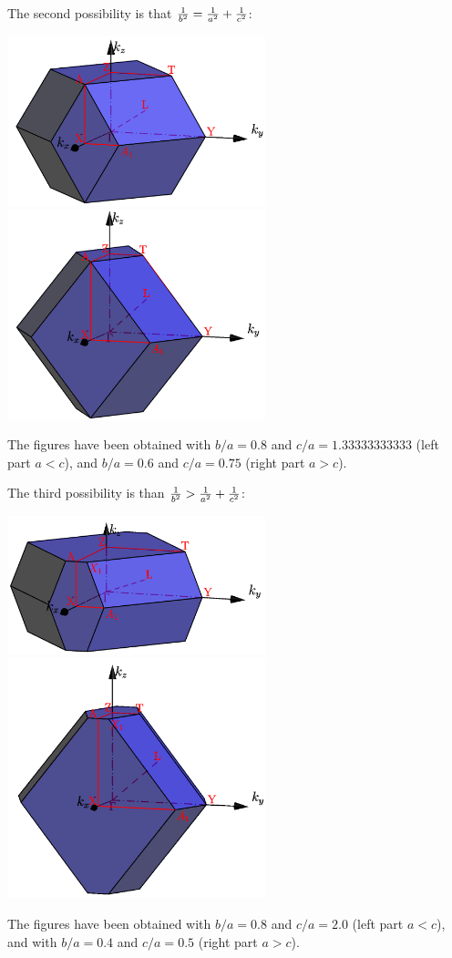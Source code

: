 \documentclass[12pt,a4paper]{article}
\begin{document}
The second possibility is that ${1 \over b^2}={1\over a^2} + {1\over c^2}$:
\begin{center}
\includegraphics[width=7.5cm,angle=0]{images/ofc_15.png} \hspace{1cm}
\includegraphics[width=7.5cm,angle=0]{images/ofc_16.png} 
\end{center}
The figures have been obtained with $b/a=0.8$ and $c/a=1.33333333333$ (left
part $a<c$), and $b/a=0.6$ and $c/a=0.75$ (right part $a>c$).

The third possibility is than ${1\over b^2}>{1\over a^2} + {1\over c^2}$:
\begin{center}
\includegraphics[width=7.5cm,angle=0]{images/ofc_9.png} \hspace{1cm}
\includegraphics[width=7.5cm,angle=0]{images/ofc_10.png} 
\end{center}
The figures have been obtained with $b/a=0.8$ and $c/a=2.0$ (left part $a<c$),
and with $b/a=0.4$ and $c/a=0.5$ (right part $a>c$).
\end{document}
